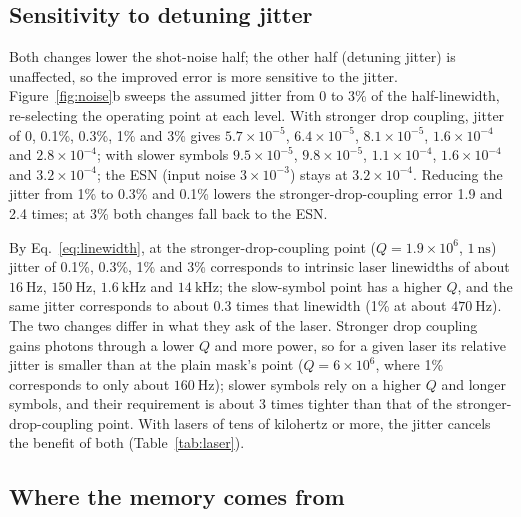 \subsection{Sensitivity to detuning jitter}

Both changes lower the shot-noise half; the other half (detuning jitter) is unaffected, so the improved error is more sensitive to
the jitter. Figure~\ref{fig:noise}b sweeps the assumed jitter from 0 to 3\% of the half-linewidth, re-selecting the operating point at
each level. With stronger drop coupling, jitter of 0, 0.1\%, 0.3\%, 1\% and 3\% gives $5.7\times10^{-5}$, $6.4\times10^{-5}$,
$8.1\times10^{-5}$, $1.6\times10^{-4}$ and $2.8\times10^{-4}$; with slower symbols $9.5\times10^{-5}$, $9.8\times10^{-5}$,
$1.1\times10^{-4}$, $1.6\times10^{-4}$ and $3.2\times10^{-4}$; the ESN (input noise $3\times10^{-3}$) stays at $3.2\times10^{-4}$.
Reducing the jitter from 1\% to 0.3\% and 0.1\% lowers the stronger-drop-coupling error 1.9 and 2.4 times; at 3\% both changes fall
back to the ESN.

By Eq.~\eqref{eq:linewidth}, at the stronger-drop-coupling point ($Q=1.9\times10^{6}$, $1~\mathrm{ns}$) jitter of 0.1\%, 0.3\%, 1\%
and 3\% corresponds to intrinsic laser linewidths of about $16~\mathrm{Hz}$, $150~\mathrm{Hz}$, $1.6~\mathrm{kHz}$ and
$14~\mathrm{kHz}$; the slow-symbol point has a higher $Q$, and the same jitter corresponds to about 0.3 times that linewidth (1\% at
about $470~\mathrm{Hz}$). The two changes differ in what they ask of the laser. Stronger drop coupling gains photons through a lower
$Q$ and more power, so for a given laser its relative jitter is smaller than at the plain mask's point ($Q=6\times10^{6}$, where 1\%
corresponds to only about $160~\mathrm{Hz}$); slower symbols rely on a higher $Q$ and longer symbols, and their requirement is about 3
times tighter than that of the stronger-drop-coupling point. With lasers of tens of kilohertz or more, the jitter cancels the benefit
of both (Table~\ref{tab:laser}).

\subsection{Where the memory comes from}\label{sec:memory}

